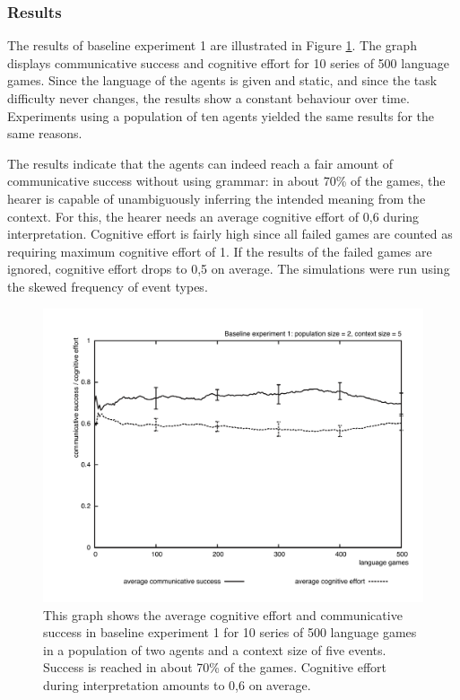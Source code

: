\subsubsection{Results}
 The results of baseline experiment 1 are illustrated in Figure \ref{f:base1-effort2}. The graph displays communicative success and cognitive effort for 10 series of 500 language games. Since the language of the agents is given and static, and since the task difficulty never changes, the results show a constant behaviour over time. Experiments using a population of ten agents yielded the same results for the same reasons.

The results indicate that the agents can indeed reach a fair amount of communicative success without using grammar: in about 70\% of the games, the hearer is capable of unambiguously inferring the intended meaning from the context. For this, the hearer needs an average cognitive effort of 0,6 during interpretation. Cognitive effort is fairly high since all failed games are counted as requiring maximum cognitive effort of 1. If the results of the failed games are ignored, cognitive effort drops to 0,5 on average. The simulations were run using the skewed frequency of event types.

\begin{figure}[htb]
\centerline{\includegraphics[width=\textwidth]{Chapter3/figs/graph-base1-effort2}}
  \caption[Baseline experiment 1: success and effort]{This graph shows the average cognitive effort and communicative success in baseline experiment 1 for 10 series of 500 language games in a population of two agents and a context size of five events. Success is reached in about 70\% of the games. Cognitive effort during interpretation amounts to 0,6 on average.}
   \label{f:base1-effort2}
\end{figure}


